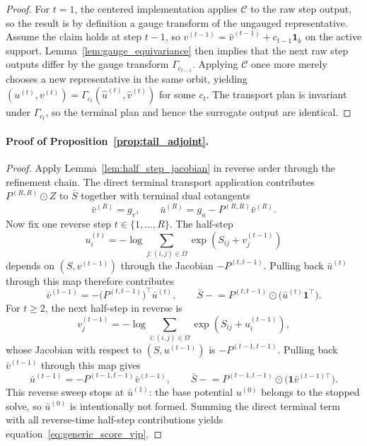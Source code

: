 \documentclass{article}
\begin{document}
\begin{proof}
For $t=1$, the centered implementation applies $\mathcal{C}$ to the raw step output, so the result is by definition a gauge transform of the ungauged representative. Assume the claim holds at step $t-1$, so $v^{(t-1)} = \widehat v^{(t-1)} + c_{t-1}\mathbf{1}_k$ on the active support. Lemma~\ref{lem:gauge_equivariance} then implies that the next raw step outputs differ by the gauge transform $\Gamma_{c_{t-1}}$. Applying $\mathcal{C}$ once more merely chooses a new representative in the same orbit, yielding $(u^{(t)},v^{(t)}) = \Gamma_{c_t}(\widehat u^{(t)}, \widehat v^{(t)})$ for some $c_t$. The transport plan is invariant under $\Gamma_{c_t}$, so the terminal plan and hence the surrogate output are identical.
\end{proof}

\paragraph{Proof of Proposition~\ref{prop:tail_adjoint}.}
\begin{proof}
Apply Lemma~\ref{lem:half_step_jacobian} in reverse order through the refinement chain. The direct terminal transport application contributes $P^{(R,R)} \odot Z$ to $\bar S$ together with terminal dual cotangents
\[
\bar v^{(R)} = g_v,
\qquad
\bar u^{(R)} = g_u - P^{(R,R)}\bar v^{(R)}.
\]
Now fix one reverse step $t \in \{1,\dots,R\}$. The half-step
\[
u^{(t)}_i = -\log \sum_{j:(i,j)\in\Omega}\exp(S_{ij}+v^{(t-1)}_j)
\]
depends on $(S,v^{(t-1)})$ through the Jacobian $-P^{(t,t-1)}$. Pulling back $\bar u^{(t)}$ through this map therefore contributes
\[
\bar v^{(t-1)} = -\bigl(P^{(t,t-1)}\bigr)^\top \bar u^{(t)},
\qquad
\bar S \mathrel{-}= P^{(t,t-1)} \odot \bigl(\bar u^{(t)}\mathbf{1}^\top\bigr).
\]
For $t \ge 2$, the next half-step in reverse is
\[
v^{(t-1)}_j = -\log \sum_{i:(i,j)\in\Omega}\exp(S_{ij}+u^{(t-1)}_i),
\]
whose Jacobian with respect to $(S,u^{(t-1)})$ is $-P^{(t-1,t-1)}$. Pulling back $\bar v^{(t-1)}$ through this map gives
\[
\bar u^{(t-1)} = -P^{(t-1,t-1)}\bar v^{(t-1)},
\qquad
\bar S \mathrel{-}= P^{(t-1,t-1)} \odot \bigl(\mathbf{1}\bar v^{(t-1)\top}\bigr).
\]
This reverse sweep stops at $\bar u^{(1)}$: the base potential $u^{(0)}$ belongs to the stopped solve, so $\bar u^{(0)}$ is intentionally not formed. Summing the direct terminal term with all reverse-time half-step contributions yields equation~\eqref{eq:generic_score_vjp}.
\end{proof}
\end{document}

